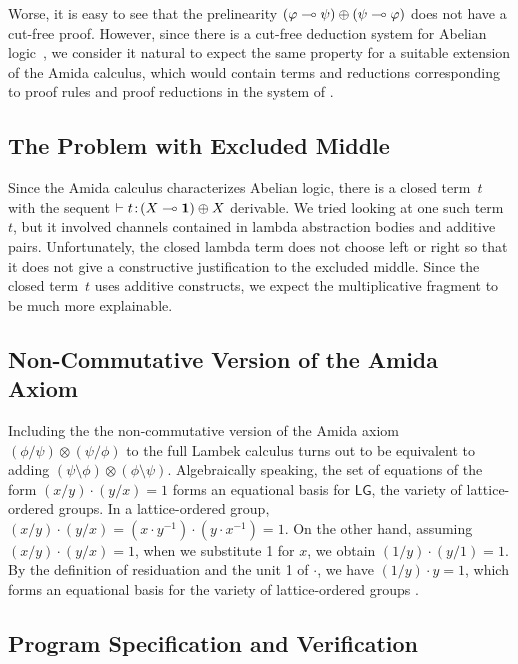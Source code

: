 Worse, it is easy to see that the prelinearity
$(\varphi\multimap\psi)\oplus(\psi\multimap\varphi)$ does not have a cut-free proof.
However,
since there is a cut-free deduction system for Abelian
logic~\citep{metcalfe2006},
we consider it natural to expect the same property for a suitable
extension of the Amida calculus, which would contain terms and reductions
corresponding to proof rules and proof reductions in the system of \citet{metcalfe2006}.

\subsection{The Problem with Excluded Middle}
\label{computational-meaning}

Since the Amida calculus characterizes Abelian logic,
there is a closed term~$t$ with the sequent $\vdash{t} \mathord{\colon\kern -2pt}{(X\multimap \mathbf{1})\oplus X}$
derivable.
We tried looking at one such term~$t$, but it involved channels
contained in lambda abstraction bodies and additive pairs.
Unfortunately, the closed lambda term does not choose left or right so
that it does not give a constructive justification to the excluded
middle.
Since the closed term~$t$ uses additive constructs, we expect the
multiplicative fragment to be much more explainable.

\subsection{Non-Commutative Version of the Amida Axiom}

Including the
the non-commutative version of the Amida axiom $(\phi/\psi)\otimes(\psi/\phi)$
to the full Lambek calculus turns out to be equivalent to
adding $(\psi\setminus\phi)\otimes(\phi\setminus\psi)$.
Algebraically speaking,
the set of equations of the form $(x/y)\cdot(y/x) = 1$ forms an
equational basis for $\mathsf{LG}$, the variety of lattice-ordered
groups.
In a lattice-ordered group,
$(x/y)\cdot (y/x) = (x \cdot y^{-1}) \cdot (y \cdot x^{-1}) = 1$.
On the other hand, assuming $(x/y)\cdot (y/x) = 1$, when we substitute 1
for $x$, we obtain $(1/y)\cdot (y/1) = 1$.
By the definition of residuation and the unit 1 of $\cdot$,
we have $(1/y)\cdot y = 1$, which forms an equational basis for the
variety of lattice-ordered groups \citep[Lemma~3.25]{residuated}.

\subsection{Program Specification and Verification}

